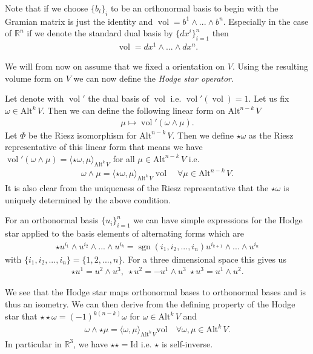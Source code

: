 \documentclass[12pt,a4paper]{article}
\numberwithin{equation}{subsection}
\numberwithin{lemma}{subsection}
\theoremstyle{definition}
\DeclareMathOperator{\sgn}{sgn}
\DeclareMathOperator{\vol}{vol}
\newcommand{\alternating}[2]{ {\text{Alt}^{#1}\,#2} }
\newcommand{\real}{\mathbb{R}}
\begin{document}
Note that if we choose $\{ b_i \}_{i}$ to be an orthonormal basis to begin 
with the Gramian matrix is just the identity and 
$\vol = b^1 \wedge ... \wedge b^n$. Especially in the case of $\real^n$ if 
we denote the standard dual basis by $\{ dx^i \}_{i=1}^n$ then 
\begin{align*}
    \vol = dx^1 \wedge ... \wedge dx^n.
\end{align*}

We will from now on assume that we fixed a orientation on $V$. 
Using the resulting volume form on $V$
we can now define the \textit{Hodge star operator}.

Let denote with $\vol'$ the dual basis of $\vol$ i.e.
$\vol'(\vol) = 1$. Let us fix $\omega \in \alternating{k}{V}$. 
Then we can define the following linear form on $
\alternating{n-k}{V}$
\begin{align*}
    \mu \mapsto \vol' (\omega \wedge \mu).
\end{align*}
Let $\Phi$ be the Riesz isomorphism for $\alternating{n-k}{V}$. Then we define
$\star \omega$ as the Riesz representative of this linear form that means we 
have $\vol'(\omega \wedge \mu) = 
\langle \star \omega, \mu \rangle_{\alternating{k}{V}}$ for all 
$\mu \in \alternating{n-k}{V}$ i.e.
\begin{align*}
    \omega \wedge \mu = \langle \star \omega, \mu \rangle_{\alternating{k}{V}}
    \vol \quad \forall \mu \in \alternating{n-k}{V}.
\end{align*}
It is also clear from the uniqueness of the Riesz representative that 
the $\star\omega$ is uniquely determined by the above condition.

For an orthonormal basis $\{u_i \}_{i=1}^n$ we 
can have simple expressions for the Hodge star applied to the basis elements 
of alternating forms which are 
\begin{align}
    \star u^{i_1} \wedge u^{i_2} \wedge ... \wedge u^{i_k}
    = \sgn(i_1,i_2,...,i_n) u^{i_{k+1}} \wedge ... \wedge u^{i_{n}}
    \label{eq:hodge_star_orthonormal_basis}
\end{align}
with $\{i_1, i_2 , ... , i_n\} = \{1,2,...,n\}$. For a three dimensional 
space this gives us
\begin{align*}
    \star u^1 = u^2 \wedge u^3, \; \star u^2 = - u^1 \wedge u^3
    \; \star u^3 = u^1 \wedge u^2. 
\end{align*}

We see that the Hodge star maps orthonormal bases to orthonormal bases 
and is thus an isometry.
We can then derive from the defining property of the Hodge star 
that $\star\star \omega= (-1)^{k(n-k)}\omega$ 
for $\omega \in \alternating{k}{V}$ and 
\begin{align*}
    \omega \wedge \star\mu = \langle \omega, \mu \rangle_{\alternating{k}{V}} 
    \text{vol} \quad \forall \omega, \mu \in \alternating{k}{V}.
\end{align*}
In particular in $\real^3$, we have 
$\star\star = \text{Id}$ i.e. $\star$ is self-inverse.
\end{document}
